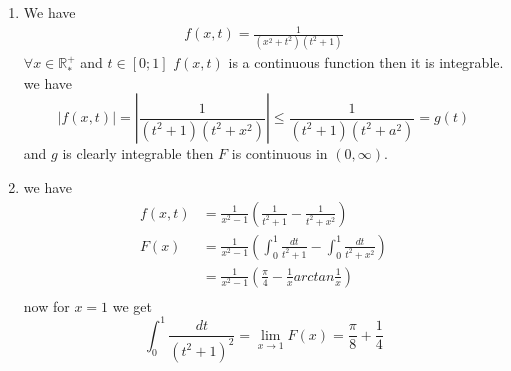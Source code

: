 
\begin{solution}
\begin{enumerate}
  \item  We have 
  $$ \begin{align}
    f(x,t) = \frac{1}{(x^2 + t^2)(t^2 + 1)}
  \end{align} $$
  $\forall x \in \mathbb{R}_*^+$ and $t \in [0;1]$ $f(x,t)$ is a continuous function then it is integrable.
  we have $$ |f(x,t)| = \left| \frac{1}{(t^2 + 1)(t^2 + x^2)}\right| \le \frac{1}{(t^2 + 1)(t^2 + a^2)} = g(t)$$
  and $g$ is clearly integrable then $F$ is continuous in $(0,\infty)$.

  \item we have $$\begin{align}
      f(x,t) & = \frac{1}{x^2 - 1} \left(\frac{1}{t^2 +1} - \frac{1}{t^2 + x^2}\right) \\
        F(x) & = \frac{1}{x^2 - 1} \left(\int_0^1 \frac{dt}{t^2 +1} - \int_0^1 \frac{dt}{t^2 + x^2}\right) \\
           & = \frac{1}{x^2 - 1} \left(\frac{\pi}{4} - \frac{1}{x}arctan\frac{1}{x}\right) \\ 
  \end{align}$$
  now for $x=1$ we get $$\int_0^1 \frac{dt}{(t^2 + 1)^2} = \lim_{x  \to 1} F(x)  = \frac{\pi}{8} + \frac{1}{4}$$
\end{enumerate}
\end{solution}


